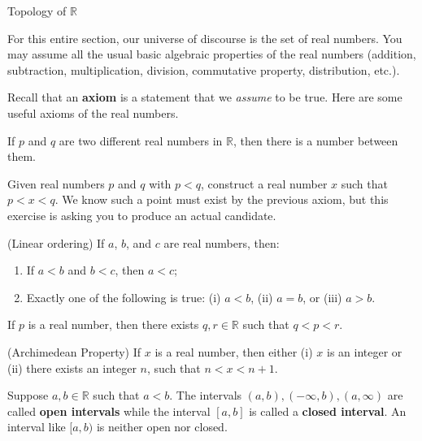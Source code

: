 \begin{section}{Topology of $\mathbb{R}$}


For this entire section, our universe of discourse is the set of real numbers.  You may assume all the usual basic algebraic properties of the real numbers (addition, subtraction, multiplication, division, commutative property, distribution, etc.).

Recall that an \textbf{axiom} is a statement that we \emph{assume} to be true.  Here are some useful axioms of the real numbers.

\begin{axiom} 
If $p$ and $q$ are two different real numbers in $\mathbb{R}$, then there is a number between them.
\end{axiom}

\begin{exercise}
Given real numbers $p$ and $q$ with $p<q$, construct a real number $x$ such that $p<x<q$.  We know such a point must exist by the previous axiom, but this exercise is asking you to produce an actual candidate.
\end{exercise}

\begin{axiom}
(Linear ordering) If $a$, $b$, and $c$ are real numbers, then:
\begin{enumerate}[label=\textrm{(\alph*)}]
\item If $a < b$ and $b<c$, then $a<c$;
\item Exactly one of the following is true: (i) $a < b$, (ii) $a=b$, or (iii) $a>b$.
\end{enumerate}
\end{axiom}

\begin{axiom}
If $p$ is a real number, then there exists $q,r\in\mathbb{R}$ such that $q<p<r$.
\end{axiom}

\begin{axiom}
(Archimedean Property) If $x$ is a real number, then either (i) $x$ is an integer or (ii) there exists an integer $n$, such that $n<x<n+1$. 
\end{axiom}

\begin{definition}
Suppose $a,b\in\mathbb{R}$ such that $a<b$.  The intervals $(a,b), (-\infty,b), (a,\infty)$ are called \textbf{open intervals} while the interval $[a,b]$ is called a \textbf{closed interval}.  An interval like $[a,b)$ is neither open nor closed.
\end{definition}


\end{section}
